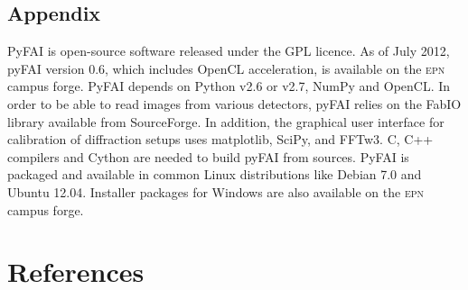 \documentclass[a4paper]{jpconf}
\begin{document}
\subsection*{Appendix}
PyFAI is open-source software released under the GPL licence.
As of July 2012, pyFAI version 0.6, which includes OpenCL
acceleration, is available on the \textsc{epn} campus forge\cite{forge}.
PyFAI depends on Python v2.6 or v2.7, NumPy\cite{numpy} and OpenCL\cite{opencl}.
In order to be able to read images from various detectors, pyFAI relies on the
FabIO\cite{fabio} library available from SourceForge.
In addition, the graphical user interface for calibration of diffraction setups
uses matplotlib\cite{matplotlib}, SciPy\cite{scipy}, and FFTw3\cite{fftw}.
C, C++ compilers and Cython\cite{cython} are needed to build pyFAI from
sources.
PyFAI is packaged and available in common Linux distributions like Debian
7.0 and Ubuntu 12.04. Installer packages for Windows are also
available on the \textsc{epn} campus forge.

\section*{References}


\end{document}
